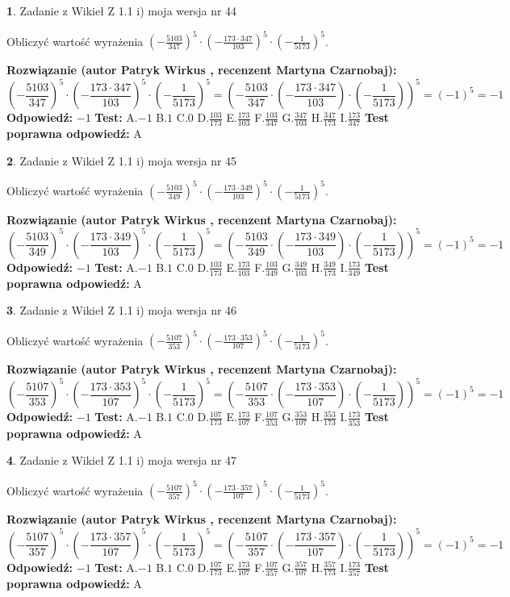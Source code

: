 \documentclass[12pt, a4paper]{article}
\theoremstyle{definition} %
\newtheorem{zad}{}
\newcommand{\zadStart}[1]{\begin{zad}#1\newline}
\newcommand{\zadStop}{\end{zad}}
\newcommand{\rozwStart}[2]{\noindent \textbf{Rozwiązanie (autor #1 , recenzent #2): }\newline}
\newcommand{\rozwStop}{\newline}
\newcommand{\odpStart}{\noindent \textbf{Odpowiedź:}\newline}
\newcommand{\odpStop}{\newline}
\newcommand{\testStart}{\noindent \textbf{Test:}\newline}
\newcommand{\testStop}{\newline}
\newcommand{\kluczStart}{\noindent \textbf{Test poprawna odpowiedź:}\newline}
\newcommand{\kluczStop}{\newline}
\begin{document}
\zadStart{Zadanie z Wikieł Z 1.1 i) moja wersja nr 44}

Obliczyć wartość wyrażenia $(-\frac{5103}{347})^{5} \cdot (-\frac{173 \cdot 347}{103})^{5} \cdot (-\frac{1}{5173})^{5}$.
\zadStop
\rozwStart{Patryk Wirkus}{Martyna Czarnobaj}
$$(-\frac{5103}{347})^{5} \cdot (-\frac{173 \cdot 347}{103})^{5} \cdot (-\frac{1}{5173})^{5} = (-\frac{5103}{347} \cdot (-\frac{173 \cdot 347}{103}) \cdot (-\frac{1}{5173}))^{5} = (-1)^{5} = -1$$
\rozwStop
\odpStart
$-1$
\odpStop
\testStart
A.$-1$ B.$1$ C.$0$ D.$\frac{103}{173}$ E.$\frac{173}{103}$
F.$\frac{103}{347}$ G.$\frac{347}{103}$
H.$\frac{347}{173}$
I.$\frac{173}{347}$
\testStop
\kluczStart
A
\kluczStop



\zadStart{Zadanie z Wikieł Z 1.1 i) moja wersja nr 45}

Obliczyć wartość wyrażenia $(-\frac{5103}{349})^{5} \cdot (-\frac{173 \cdot 349}{103})^{5} \cdot (-\frac{1}{5173})^{5}$.
\zadStop
\rozwStart{Patryk Wirkus}{Martyna Czarnobaj}
$$(-\frac{5103}{349})^{5} \cdot (-\frac{173 \cdot 349}{103})^{5} \cdot (-\frac{1}{5173})^{5} = (-\frac{5103}{349} \cdot (-\frac{173 \cdot 349}{103}) \cdot (-\frac{1}{5173}))^{5} = (-1)^{5} = -1$$
\rozwStop
\odpStart
$-1$
\odpStop
\testStart
A.$-1$ B.$1$ C.$0$ D.$\frac{103}{173}$ E.$\frac{173}{103}$
F.$\frac{103}{349}$ G.$\frac{349}{103}$
H.$\frac{349}{173}$
I.$\frac{173}{349}$
\testStop
\kluczStart
A
\kluczStop



\zadStart{Zadanie z Wikieł Z 1.1 i) moja wersja nr 46}

Obliczyć wartość wyrażenia $(-\frac{5107}{353})^{5} \cdot (-\frac{173 \cdot 353}{107})^{5} \cdot (-\frac{1}{5173})^{5}$.
\zadStop
\rozwStart{Patryk Wirkus}{Martyna Czarnobaj}
$$(-\frac{5107}{353})^{5} \cdot (-\frac{173 \cdot 353}{107})^{5} \cdot (-\frac{1}{5173})^{5} = (-\frac{5107}{353} \cdot (-\frac{173 \cdot 353}{107}) \cdot (-\frac{1}{5173}))^{5} = (-1)^{5} = -1$$
\rozwStop
\odpStart
$-1$
\odpStop
\testStart
A.$-1$ B.$1$ C.$0$ D.$\frac{107}{173}$ E.$\frac{173}{107}$
F.$\frac{107}{353}$ G.$\frac{353}{107}$
H.$\frac{353}{173}$
I.$\frac{173}{353}$
\testStop
\kluczStart
A
\kluczStop



\zadStart{Zadanie z Wikieł Z 1.1 i) moja wersja nr 47}

Obliczyć wartość wyrażenia $(-\frac{5107}{357})^{5} \cdot (-\frac{173 \cdot 357}{107})^{5} \cdot (-\frac{1}{5173})^{5}$.
\zadStop
\rozwStart{Patryk Wirkus}{Martyna Czarnobaj}
$$(-\frac{5107}{357})^{5} \cdot (-\frac{173 \cdot 357}{107})^{5} \cdot (-\frac{1}{5173})^{5} = (-\frac{5107}{357} \cdot (-\frac{173 \cdot 357}{107}) \cdot (-\frac{1}{5173}))^{5} = (-1)^{5} = -1$$
\rozwStop
\odpStart
$-1$
\odpStop
\testStart
A.$-1$ B.$1$ C.$0$ D.$\frac{107}{173}$ E.$\frac{173}{107}$
F.$\frac{107}{357}$ G.$\frac{357}{107}$
H.$\frac{357}{173}$
I.$\frac{173}{357}$
\testStop
\kluczStart
A
\kluczStop
\end{document}
